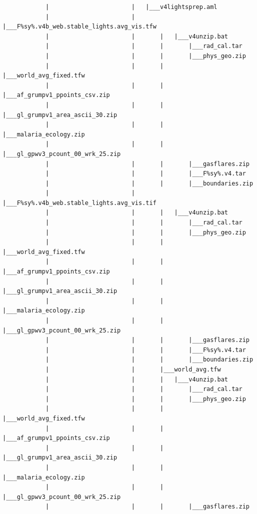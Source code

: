 \documentclass[
]{book}
\begin{document}
\begin{verbatim}
            |                       |   |___v4lightsprep.aml
            |                       |       |___F%sy%.v4b_web.stable_lights.avg_vis.tfw
            |                       |       |   |___v4unzip.bat
            |                       |       |       |___rad_cal.tar
            |                       |       |       |___phys_geo.zip
            |                       |       |       |___world_avg_fixed.tfw
            |                       |       |       |___af_grumpv1_ppoints_csv.zip
            |                       |       |       |___gl_grumpv1_area_ascii_30.zip
            |                       |       |       |___malaria_ecology.zip
            |                       |       |       |___gl_gpwv3_pcount_00_wrk_25.zip
            |                       |       |       |___gasflares.zip
            |                       |       |       |___F%sy%.v4.tar
            |                       |       |       |___boundaries.zip
            |                       |       |___F%sy%.v4b_web.stable_lights.avg_vis.tif
            |                       |       |   |___v4unzip.bat
            |                       |       |       |___rad_cal.tar
            |                       |       |       |___phys_geo.zip
            |                       |       |       |___world_avg_fixed.tfw
            |                       |       |       |___af_grumpv1_ppoints_csv.zip
            |                       |       |       |___gl_grumpv1_area_ascii_30.zip
            |                       |       |       |___malaria_ecology.zip
            |                       |       |       |___gl_gpwv3_pcount_00_wrk_25.zip
            |                       |       |       |___gasflares.zip
            |                       |       |       |___F%sy%.v4.tar
            |                       |       |       |___boundaries.zip
            |                       |       |___world_avg.tfw
            |                       |       |   |___v4unzip.bat
            |                       |       |       |___rad_cal.tar
            |                       |       |       |___phys_geo.zip
            |                       |       |       |___world_avg_fixed.tfw
            |                       |       |       |___af_grumpv1_ppoints_csv.zip
            |                       |       |       |___gl_grumpv1_area_ascii_30.zip
            |                       |       |       |___malaria_ecology.zip
            |                       |       |       |___gl_gpwv3_pcount_00_wrk_25.zip
            |                       |       |       |___gasflares.zip

\end{verbatim}
\end{document}
